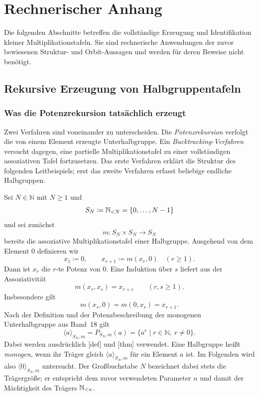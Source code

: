 \documentclass[main.tex]{subfiles}
\begin{document}
\chapter{Rechnerischer Anhang}

Die folgenden Abschnitte betreffen die vollständige Erzeugung und
Identifikation kleiner Multiplikationstafeln.  Sie sind rechnerische
Anwendungen der zuvor bewiesenen Struktur- und Orbit-Aussagen und werden
für deren Beweise nicht benötigt.

\section{Rekursive Erzeugung von Halbgruppentafeln}

\subsection{Was die Potenzrekursion tatsächlich erzeugt}

Zwei Verfahren sind voneinander zu unterscheiden.  Die
\emph{Potenzrekursion} verfolgt die von einem Element erzeugte
Unterhalbgruppe.  Ein \emph{Backtracking-Verfahren} versucht dagegen, eine
partielle Multiplikationstafel zu einer vollständigen assoziativen Tafel
fortzusetzen.  Das erste Verfahren erklärt die Struktur des folgenden
Leitbeispiels; erst das zweite Verfahren erfasst beliebige endliche
Halbgruppen.

Sei \(N\in\mathbb N\) mit \(N\geq1\) und
\[
  S_N\coloneqq\mathbb{N}_{<N}=\{0,\ldots,N-1\}
\]
und sei zunächst
\[
  m\colon S_N\times S_N\to S_N
\]
bereits die assoziative Multiplikationstafel einer Halbgruppe.  Ausgehend von
dem Element \(0\) definieren wir
\[
  x_1\coloneqq0,
  \qquad
  x_{r+1}\coloneqq m(x_r,0)
  \quad(r\geq1).
\]
Dann ist \(x_r\) die \(r\)-te Potenz von \(0\).  Eine Induktion über \(s\)
liefert aus der Assoziativität
\[
  \boxed{m(x_r,x_s)=x_{r+s}}
  \qquad(r,s\geq1).
\]
Insbesondere gilt
\[
  m(x_r,0)=m(0,x_r)=x_{r+1}.
\]
Nach der Definition und der Potenzbeschreibung der monogenen
Unterhalbgruppe aus Band~18 gilt
\[
  \langle a\rangle_{S_N,m}
  =P_{S_N,m}(a)
  =\{a^r\mid r\in\mathbb N,\ r\neq0\}.
\]
Dabei werden ausdrücklich
[def] und
[thm] verwendet.  Eine
Halbgruppe heißt \emph{monogen}, wenn ihr Träger gleich
\(\langle a\rangle_{S_N,m}\) für ein Element \(a\) ist.  Im Folgenden wird
also \(\langle0\rangle_{S_N,m}\) untersucht.  Der Großbuchstabe \(N\) bezeichnet dabei
stets die Trägergröße; er entspricht dem zuvor verwendeten Parameter \(n\)
und damit der Mächtigkeit des Trägers \(\mathbb{N}_{<n}\).
\end{document}
